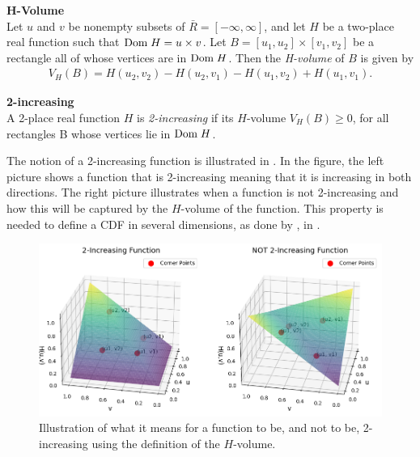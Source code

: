 \begin{definition}\label{def:H-volume} \textbf{H-Volume} \citet[p.~8]{Nelsen2006}\\
    Let $u$ and $v$ be nonempty subsets of $\bar{R} = [-\infty, \infty]$, and let $H$ be a two-place real function such that $\mathrm{Dom \;} H = u\times v$. Let $B = [u_1,u_2]\times[v_1,v_2]$  be a rectangle all of whose vertices are in $\mathrm{Dom \;} H$. Then
    the \emph{H-volume} of $B$ is given by
    \begin{align*}
        V_H(B) = H(u_2,v_2) - H(u_2,v_1) - H(u_1,v_2) + H(u_1,v_1).
    \end{align*}
\end{definition}

\begin{definition}\label{def:2-Increasing} \textbf{2-increasing} \citet[p.~8]{Nelsen2006}\\
     A 2-place real function $H$ is \emph{2-increasing} if its $H$-volume $V_H(B)\geq0$, for all rectangles B whose vertices lie in $\mathrm{Dom \;} H$.
\end{definition}

The notion of a 2-increasing function is illustrated in . In the figure, the left picture shows a function that is 2-increasing meaning that it is increasing in both directions. The right picture illustrates when a function is not 2-increasing and how this will be captured by the $H$-volume of the function. This property is needed to define a \gls{CDF} in several dimensions, as done by \citet[p.~17]{Nelsen2006}, in . 

\begin{figure}
    \centering
    \includegraphics[width=1\linewidth]{3Theory/pictures/2increasingAndNot.png}
    \caption{Illustration of what it means for a function to be, and not to be, 2-increasing using the definition of the $H$-volume.}
    \label{fig:2-Increasing}
\end{figure}



